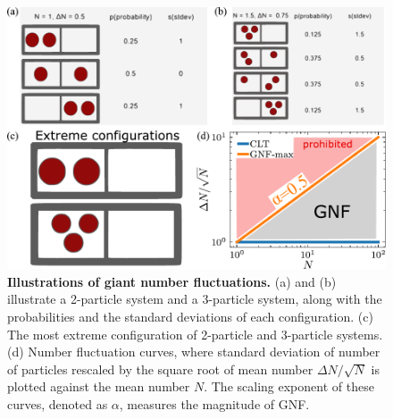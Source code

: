  \begin{figure}[h]
 	\begin{center}
 	\includegraphics[width=5 in]{Figs/1-Intro/GNF-illustration.pdf}
 	\end{center}
 	\caption[Illustrations of Giant Number Fluctuations]
 	{
	\textbf{Illustrations of giant number fluctuations.}
	(a) and (b) illustrate a 2-particle system and a 3-particle system, along with the probabilities and the standard deviations of each configuration.
	(c) The most extreme configuration of 2-particle and 3-particle systems.
	(d) Number fluctuation curves, where standard deviation of number of particles rescaled by the square root of mean number $\Delta N/\sqrt N$ is plotted against the mean number $N$. The scaling exponent of these curves, denoted as $\alpha$, measures the magnitude of GNF.
 	}
 	\label{fig:GNF-illustration}
 \end{figure}


